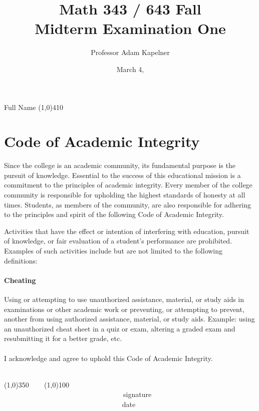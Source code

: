 \documentclass[12pt]{article}
\title{Math 343 / 643 Fall \the\year{} \\ Midterm Examination One}
\author{Professor Adam Kapelner}
\date{March 4, \the\year{}}
\begin{document}
\maketitle

\noindent Full Name \line(1,0){410}

\thispagestyle{empty}

\section*{Code of Academic Integrity}

\footnotesize
Since the college is an academic community, its fundamental purpose is the pursuit of knowledge. Essential to the success of this educational mission is a commitment to the principles of academic integrity. Every member of the college community is responsible for upholding the highest standards of honesty at all times. Students, as members of the community, are also responsible for adhering to the principles and spirit of the following Code of Academic Integrity.

Activities that have the effect or intention of interfering with education, pursuit of knowledge, or fair evaluation of a student's performance are prohibited. Examples of such activities include but are not limited to the following definitions:

\paragraph{Cheating} Using or attempting to use unauthorized assistance, material, or study aids in examinations or other academic work or preventing, or attempting to prevent, another from using authorized assistance, material, or study aids. Example: using an unauthorized cheat sheet in a quiz or exam, altering a graded exam and resubmitting it for a better grade, etc.\\
\\
\noindent I acknowledge and agree to uphold this Code of Academic Integrity. \\~\\

\begin{center}
\line(1,0){350} ~~~ \line(1,0){100}\\
~~~~~~~~~~~~~~~~~~~~~~~~~~~~~~~~~~signature~~~~~~~~~~~~~~~~~~~~~~~~~~~~~~~~~~~~~~~~~~~~~~~~~~~~~~~~~~~~~~ date
\end{center}

\normalsize
\end{document}
